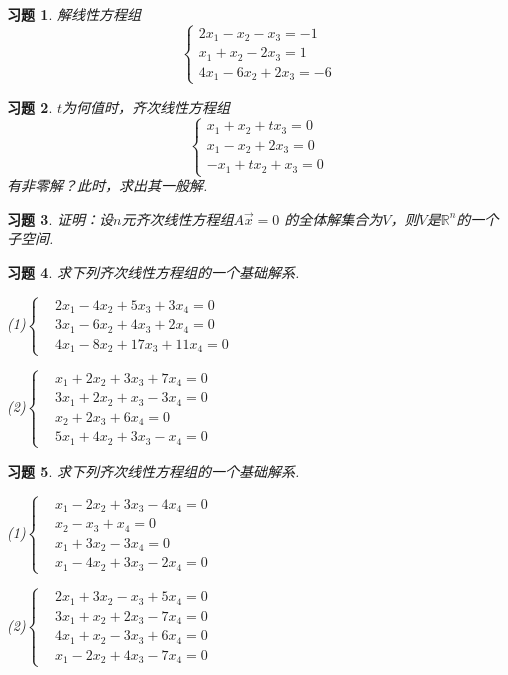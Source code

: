 \documentclass[a4paper]{book}
\newtheorem{ex}{习题}[chapter]
\begin{document}
\begin{ex}\label{5.4}
解线性方程组
\begin{equation*}
\begin{cases}
2x_1-x_2-x_3=-1\\
x_1+x_2-2x_3=1\\
4x_1-6x_2+2x_3=-6
\end{cases}
\end{equation*}
\end{ex}

\begin{ex}\label{5.5}
$t$为何值时，齐次线性方程组
\begin{equation*}
\begin{cases}
x_1+x_2+tx_3=0\\
x_1-x_2+2x_3=0\\
-x_1+tx_2+x_3=0
\end{cases}
\end{equation*}
有非零解？此时，求出其一般解.
\end{ex}

\begin{ex}\label{5.6}
证明：设$n$元齐次线性方程组$A\vec{x}=0$ 的全体解集合为$V$，则$V$是$\mathbb{R}^n$的一个子空间.
\end{ex}

\begin{ex}\label{5.7}
求下列齐次线性方程组的一个基础解系.

(1)$\left\{\begin{aligned}&2x_1-4x_2+5x_3+3x_4=0\\&3x_1-6x_2+4x_3+2x_4=0\\&4x_1-8x_2+17x_3+11x_4=0\end{aligned}
\right.$

(2)$\left\{\begin{aligned}& x_1+2x_2+3x_3+7x_4=0 \\&3x_1+2x_2+ x_3-3x_4=0 \\&     x_2+2x_3+6x_4=0 \\&5x_1+4x_2+3x_3- x_4=0     \end{aligned}\right.$
\end{ex}

\begin{ex}\label{5.8}
求下列齐次线性方程组的一个基础解系.

(1)$\left\{\begin{aligned}& x_1-2x_2+3x_3-4x_4=0 \\&       x _2- x_3+ x_4=0 \\&  x _1+3x_2      -3x_4=0 \\&x_1-4x_2+3x_3-2x_4=0     \end{aligned}\right.$

(2)$\left\{\begin{aligned}& 2x_1+3x_2- x_3+5x_4=0 \\&3x_1+ x_2+2x_3-7x_4=0 \\&4x_1+ x_2-3x_3+6x_4=0 \\& x_1-2x_2+4x_3-7x_4=0    \end{aligned}\right.$
\end{ex}
\end{document}
